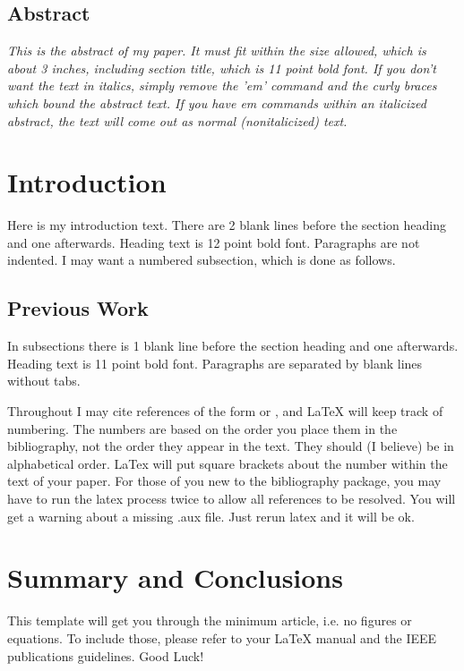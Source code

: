 \maketitle

\thispagestyle{empty}

\subsection*{\centering Abstract}
{\em
This is the abstract of my paper.  It must fit within the size allowed, which
is about 3 inches, including section title, which is 11 point bold font.  If 
you don't want the text in italics, simply remove the 'em' command and the 
curly braces which bound the abstract text.  If you have em commands within an 
italicized abstract, the text will come out as normal (nonitalicized) text.  
}

\section{Introduction}

Here is my introduction text.  There are 2 blank lines before the section 
heading and one afterwards.  Heading text is 12 point bold font.  Paragraphs 
are not indented.  I may want a numbered subsection, which is done as follows.

\subsection{Previous Work}
In subsections there is 1 blank line before the section heading and one 
afterwards.  Heading text is 11 point bold font.  Paragraphs are separated by 
blank lines without tabs.

Throughout I may cite references of the form \cite{key:foo} or
\cite{foo:baz}, and LaTeX will keep track of numbering.  The numbers are based
on the order you place them in the bibliography, not the order they appear in
the text.  They should (I believe) be in alphabetical order.  LaTex will put
square brackets about the number within the text of your paper.  For those of 
you new to the bibliography package, you may have to run the latex process 
twice to allow all references to be resolved.  You will get a warning about
a missing .aux file.  Just rerun latex and it will be ok.

\section{Summary and Conclusions}
This template will get you through the minimum article, i.e. no figures or
equations.  To include those, please refer to your LaTeX manual and the IEEE
publications guidelines.  Good Luck!

